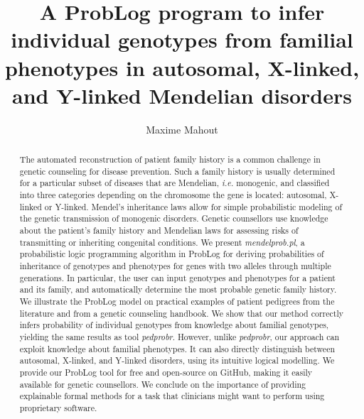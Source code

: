 \documentclass{eptcs}
\begin{document}


\title{A ProbLog program to infer individual genotypes from familial phenotypes in autosomal, X-linked, and Y-linked Mendelian disorders}

\newcommand{\titlerunning}[1]{\def\titlerunning{#1}}
\newcommand{\authorrunning}[1]{\def\authorrunning{#1}}

\titlerunning{A ProbLog program for Mendelian inheritance analyses}
\authorrunning{Maxime Mahout}


\author{{Maxime} {Mahout}}




\maketitle

\begin{abstract}
The automated reconstruction of patient family history is a common challenge in genetic counseling for disease prevention. Such a family history is usually determined for a particular subset of diseases that are Mendelian, \textit{i.e.} monogenic, and classified into three categories depending on the chromosome the gene is located: autosomal, X-linked or Y-linked. Mendel’s inheritance laws allow for simple probabilistic modeling of the genetic transmission of monogenic disorders. Genetic counsellors use knowledge about the patient’s family history and Mendelian laws for assessing risks of transmitting or inheriting congenital conditions. We present \textit{mendelprob.pl}, a probabilistic logic programming algorithm in ProbLog for deriving probabilities of inheritance of genotypes and phenotypes for genes with two alleles through multiple generations. In particular, the user can input genotypes and phenotypes for a patient and its family, and automatically determine the most probable genetic family history. We illustrate the ProbLog model on practical examples of patient pedigrees from the literature and from a genetic counseling handbook. We show that our method correctly infers probability of individual genotypes from knowledge about familial genotypes, yielding the same results as tool \textit{pedprobr}. However, unlike \textit{pedprobr}, our approach can exploit knowledge about familial phenotypes. It can also directly distinguish between autosomal, X-linked, and Y-linked disorders, using its intuitive logical modelling. We provide our ProbLog tool for free and open-source on GitHub, making it easily available for genetic counsellors. We conclude on the importance of providing explainable formal methods for a task that clinicians might want to perform using proprietary software.
\end{abstract}
\end{document}
